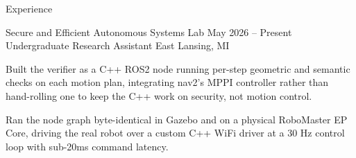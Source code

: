 \documentclass[
	11pt
]{../../../template}
\begin{document}
\begin{rSection}{E}{xperience}
		\begin{rSectionEntry}
			{Secure and Efficient Autonomous Systems Lab}
			{May 2026 -- Present}
			{Undergraduate Research Assistant}
			{}
			{East Lansing, MI}

			\item Built the verifier as a C++ ROS2 node running per-step geometric and semantic checks on each motion plan, integrating nav2's MPPI controller rather than hand-rolling one to keep the C++ work on security, not motion control.
			\item Ran the node graph byte-identical in Gazebo and on a physical RoboMaster EP Core, driving the real robot over a custom C++ WiFi driver at a 30 Hz control loop with sub-20ms command latency.
		\end{rSectionEntry}
	\end{rSection}
\end{document}
